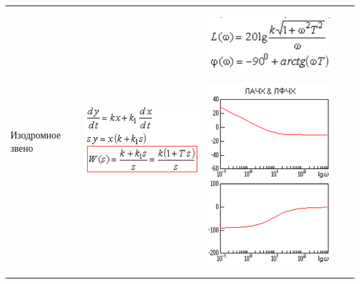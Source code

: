 \documentclass[14pt,a4paper,report]{report}
\begin{document}
\begin{table}[h!]
	\centering
	\bgroup
	\def\arraystretch{4}
	\begin{tabular}{ | m{3cm} | m{3.5cm} | m{4.5cm} | m{2.5cm} | m{2.5cm} }		
		Изодромное звено
		&
		\begin{minipage}{.3\textwidth}
			\includegraphics[scale = 0.4]{images/7_2.png}
		\end{minipage}
		&
		\begin{minipage}{.3\textwidth}
			\includegraphics[scale = 0.5]{images/7_3_f.png}
		\end{minipage}
		\begin{minipage}{.3\textwidth}
			\includegraphics[scale = 0.5]{images/7_3.png}

\end{minipage}
\end{tabular}
\end{table}
\end{document}
